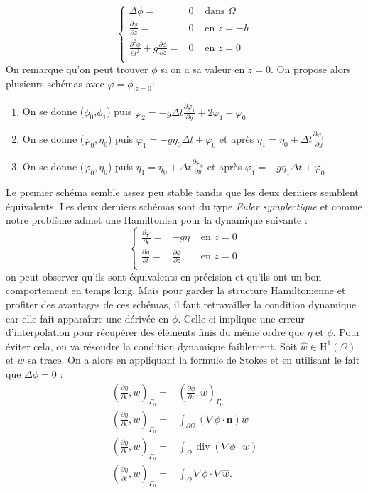 \documentclass{article}
\theoremstyle{plain}
\numberwithin{equation}{section} %
\renewcommand{\div}{\operatorname{div}}
\def\H{\mathrm{H}}
\begin{document}
\[
	\left\{
		\begin{array}{rcl}
   			\Delta \phi  =& 0  &\text{ dans }\Omega \\
   			\frac{\partial \phi }{ \partial z} =& 0 & \text{ en }z=-h \\
   			\frac{\partial^2 \phi }{ \partial t^2} +g \frac{\partial \phi }{ \partial z}=& 0 & \text{ en }z=0 \\
  		\end{array}
	\right.
\]
On remarque qu'on peut trouver $\phi$ si on a sa valeur en $z=0$. On propose alors plusieurs sch\'emas avec $\varphi=\phi_{|z=0}$:
\begin{enumerate}
	\item On se donne ($\phi_{0}$,$\phi_{1}$) puis $\varphi_2=-g\Delta t \frac{\partial \varphi_1}{\partial y}+2\varphi_1-\varphi_0$
	\item On se donne ($\varphi_0,\eta_0$) puis $\varphi_1=-g \eta_0 \Delta t +\varphi_0$ et apr\`es $\eta_1=\eta_0+\Delta t \frac{\partial \varphi_1}{\partial y}$
	\item On se donne ($\varphi_0,\eta_0$) puis $\eta_1=\eta_0+\Delta t \frac{\partial \varphi_0}{\partial y}$ et apr\`es $\varphi_1=-g \eta_1 \Delta t +\varphi_0$
\end{enumerate}
Le premier sch\'ema semble assez peu stable tandis que les deux derniers semblent \'equivalents. Les deux derniers sch\'emas sont du type \textit{Euler symplectique} et comme notre problème admet une Hamiltonien pour la dynamique suivante :
\[
	\left\{	
		\begin{array}{rcl}
			\frac{\partial \varphi}{\partial t} =& -g\eta & \text{ en }z=0\\
			\frac{\partial \eta}{\partial t} =& \frac{\partial \phi}{\partial z} & \text{ en }z=0\\
		\end{array}
	\right.
\]
on peut observer qu'ils sont \'equivalents en pr\'ecision et qu'ils ont un bon comportement en temps long. Mais pour garder la structure Hamiltonienne et profiter des avantages de ces sch\'emas, il faut retravailler la condition dynamique car elle fait appara\^itre une d\'eriv\'ee en $\phi$. Celle-ci implique une erreur d'interpolation pour r\'ecup\'erer des \'el\'ements finis du m\^eme ordre que $\eta$ et $\phi$. Pour \'eviter cela, on va r\'esoudre la condition dynamique faiblement. Soit $\hat{w}\in \H^1(\Omega)$ et $w$ sa trace. On a alors en appliquant la formule de Stokes et en utilisant le fait que $\Delta \phi =0$ :
\begin{align*}
	\left(\frac{\partial \eta}{\partial t},w\right)_{\Gamma_0}=&\left(\frac{\partial \phi}{\partial z},w\right)_{\Gamma_0}\\
	\left(\frac{\partial \eta}{\partial t},w\right)_{\Gamma_0}=&\int_{\partial \Omega}(\nabla \phi \cdot \mathbf{n}) w   \\
	\left(\frac{\partial \eta}{\partial t},w\right)_{\Gamma_0}=&\int_{\Omega} \div(\nabla \phi \mbox{ }\hat{w})   \\
	\left(\frac{\partial \eta}{\partial t},w\right)_{\Gamma_0}=&\int_{\Omega} \nabla \phi \cdot \nabla \hat{w}.
\end{align*}
\end{document}
